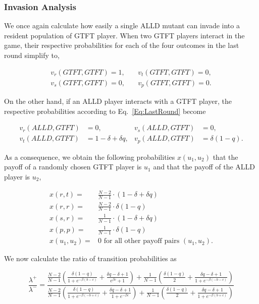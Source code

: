 \documentclass[11pt]{article}
\theoremstyle{plainCl1}
\theoremstyle{plainCl2}
\begin{document}
\subsubsection*{Invasion Analysis}

We once again calculate how easily a single ALLD mutant can invade into a
resident population of GTFT player. When two GTFT players interact in the game,
their respective probabilities for each of the four outcomes in the last round
simplify to,

\begin{align*}
    v_{r}(GTFT,GTFT) = 1, & \quad v_{t}(GTFT,GTFT) = 0, \\
    v_{s}(GTFT,GTFT) = 0, & \quad v_{p}(GTFT,GTFT) = 0.
\end{align*}

On the other hand, if an ALLD player interacts with a GTFT player, the
respective probabilities according to Eq.~\ref{Eq:LastRound} become

\begin{align*}
    v_{r}(ALLD,GTFT) & = 0, &  v_{s}(ALLD,GTFT) & = 0, \\
    v_{t} (ALLD, GTFT ) & = 1 - \delta + \delta q, &  v_{p} (ALLD, GTFT) & = \delta(1 - q).
\end{align*}

As a consequence, we obtain the following probabilities \(x(u_1, u_2)\) that the
payoff of a randomly chosen GTFT player is \(u_1\) and that the payoff of the
ALLD player is \(u_2\),

\begin{align*}
  x(r, t) = & \frac{N - 2}{N - 1} \cdot (1 - \delta + \delta q)\\
  x(r, r) = & \frac{N - 2}{N - 1} \cdot \delta (1 - q) \\
  x(s, r) = & \frac{1}{N - 1} \cdot (1 - \delta + \delta q) \\
  x(p, p) = & \frac{1}{N - 1} \cdot \delta (1 - q) \\
  x(u_1, u_2) = &  0 \text{ for all other payoff pairs } (u_1, u_2).
\end{align*}

We now calculate the ratio of transition probabilities as

\begin{equation*}
\frac{\lambda^{+}}{\lambda^{-}} = \frac{ \frac{N - 2}{N - 1}  \left( \frac{ \delta  \left(1 - q \right)}{1
+ e^{-  \beta  \left(b - c \right)}} +  \frac{ \delta q -  \delta + 1}{e^{ \beta
c} + 1} \right)  +  \frac{1}{N-1}  \left(\frac{ \delta  \left(1 - q \right)}{2} +
 \frac{ \delta q -  \delta + 1}{1 + e^{-  \beta  \left(- b - c \right)}}\right)}
 { \frac{N - 2}{N - 1}  \left( \frac{ \delta  \left(1 - q \right)}{1 +
e^{-  \beta  \left(- b + c \right)}} +  \frac{ \delta q -  \delta + 1}{1 + e^{-
 \beta c}} \right) +  \frac{1}{N -1} \left(\frac{ \delta  \left(1 - q \right)}{2} +
 \frac{ \delta q -  \delta + 1}{1 + e^{-  \beta  \left(b + c \right)}}\right)}
\end{equation*}
\end{document}
